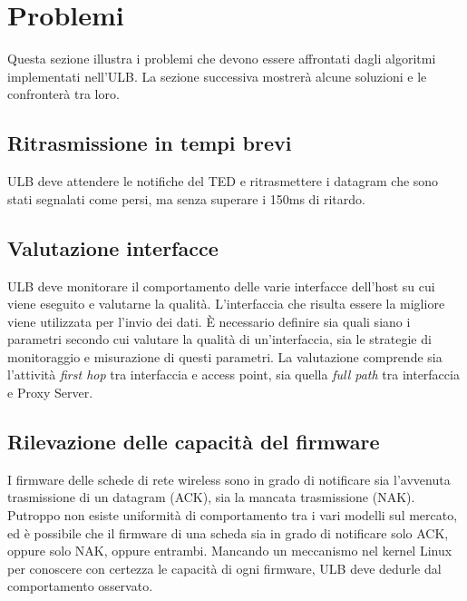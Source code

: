 \documentclass[12pt,a4paper,openright,twoside]{book}
\begin{document}
\section{Problemi}
Questa sezione illustra i problemi che devono essere affrontati dagli
algoritmi implementati nell'ULB. La sezione successiva mostrerà alcune
soluzioni e le confronterà tra loro.

\subsection{Ritrasmissione in tempi brevi}
ULB deve attendere le notifiche del TED e ritrasmettere i datagram che
sono stati segnalati come persi, ma senza superare i 150ms di ritardo.

\subsection{Valutazione interfacce}
ULB deve monitorare il comportamento delle varie interfacce dell'host
su cui viene eseguito e valutarne la qualità. L'interfaccia che
risulta essere la migliore viene utilizzata per l'invio dei dati. È
necessario definire sia quali siano i parametri secondo cui valutare
la qualità di un'interfaccia, sia le strategie di monitoraggio e
misurazione di questi parametri. La valutazione comprende sia
l'attività \emph{first hop} tra interfaccia e access point, sia quella
\emph{full path} tra interfaccia e Proxy Server.

\subsection{Rilevazione delle capacità del firmware}
I firmware delle schede di rete wireless sono in grado di notificare
sia l'avvenuta trasmissione di un datagram (ACK), sia la mancata
trasmissione (NAK). Putroppo non esiste uniformità di comportamento
tra i vari modelli sul mercato, ed è possibile che il firmware di una
scheda sia in grado di notificare solo ACK, oppure solo NAK, oppure
entrambi. Mancando un meccanismo nel kernel Linux per conoscere con
certezza le capacità di ogni firmware, ULB deve dedurle dal
comportamento osservato.
\end{document}

